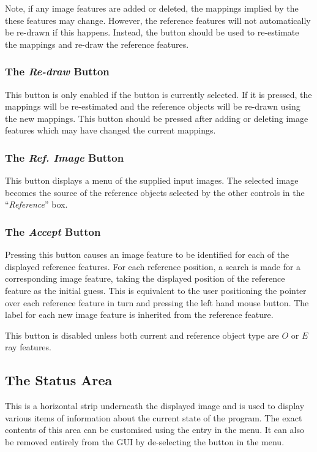 Note, if any image features are added or deleted, the mappings implied by
the these features may change. However, the reference features will not
automatically be re-drawn if this happens. Instead, the  button should be used to re-estimate the
mappings and re-draw the reference features.

\subsubsection {The {\em Re-draw} Button}
This button is only enabled if the  button is currently selected. If it is
pressed, the mappings will be re-estimated and the reference objects will
be re-drawn using the new mappings. This button should be pressed after
adding or deleting image features which may have changed the current
mappings.

\subsubsection {The {\em Ref. Image} Button}
This button displays a menu of the supplied input images. The selected
image becomes the source of the reference objects selected by the other
controls in the ``{\em Reference}'' box.

\subsubsection {The {\em Accept} Button}
Pressing this button causes an image feature to be identified for each
of the displayed reference features. For each reference position, a search 
is made for a corresponding image feature, taking the displayed position of the
reference feature as the initial guess. This is equivalent to the user
positioning the pointer over each reference feature in turn and pressing
the left hand mouse button. The label for each new image feature is
inherited from the reference feature.

This button is disabled unless both current and reference object type
are $O$ or $E$ ray features.

\subsection {The Status Area}
This is a horizontal strip underneath the displayed image and is used to
display various items of information about the current state of the
program. The exact contents of this area can be customised using the
 entry in the
 menu. It can also be removed
entirely from the GUI by de-selecting the  button in the  menu.

